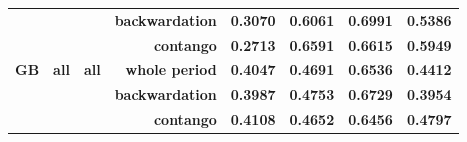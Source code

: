 \documentclass[
  authoryear,
  preprint,
  3p]{elsarticle}
\begin{document}
\begin{longtable}[t]{>{}l>{}l>{}l>{}r>{}r>{}r>{}r>{}r}
\textbf{} & \textbf{} & \textbf{} & \textbf{backwardation} & \textcolor[HTML]{4285f4}{\textbf{0.3070}} & \textcolor[HTML]{4285f4}{\textbf{0.6061}} & \textcolor[HTML]{4285f4}{\textbf{0.6991}} & \textcolor[HTML]{4285f4}{\textbf{0.5386}}\\
\textbf{} & \textbf{} & \textbf{} & \textbf{contango} & \textcolor[HTML]{4285f4}{\textbf{0.2713}} & \textcolor[HTML]{4285f4}{\textbf{0.6591}} & \textcolor[HTML]{4285f4}{\textbf{0.6615}} & \textcolor[HTML]{4285f4}{\textbf{0.5949}}\\
\addlinespace
\textbf{GB} & \textbf{all} & \textbf{all} & \textbf{whole period} & \textcolor[HTML]{4285f4}{\textbf{0.4047}} & \textcolor[HTML]{4285f4}{\textbf{0.4691}} & \textcolor[HTML]{4285f4}{\textbf{0.6536}} & \textcolor[HTML]{4285f4}{\textbf{0.4412}}\\
\textbf{} & \textbf{} & \textbf{} & \textbf{backwardation} & \textcolor[HTML]{4285f4}{\textbf{0.3987}} & \textcolor[HTML]{4285f4}{\textbf{0.4753}} & \textcolor[HTML]{4285f4}{\textbf{0.6729}} & \textcolor[HTML]{4285f4}{\textbf{0.3954}}\\
\textbf{} & \textbf{} & \textbf{} & \textbf{contango} & \textcolor[HTML]{4285f4}{\textbf{0.4108}} & \textcolor[HTML]{4285f4}{\textbf{0.4652}} & \textcolor[HTML]{4285f4}{\textbf{0.6456}} & \textcolor[HTML]{4285f4}{\textbf{0.4797}}\\
\bottomrule

\end{longtable}

\endgroup{}

\newpage

\begingroup\fontsize{7}{9}\selectfont
\end{document}

